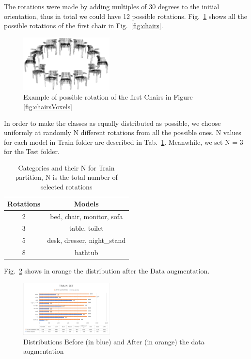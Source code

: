 The rotations were made by adding multiples of 30 degrees to the initial orientation, thus in total we could have 12 possible rotations. Fig.~\ref{fig:rotatedChair} shows all the possible rotations of the first chair in Fig.~\ref{fig:chairs}.
\begin{figure}[h]
\begin{center}
        \centering
        \includegraphics[width=0.42\textwidth]{resources/rotated_voxels_2.png}
        \caption{Example of possible rotation of the first Chairs in Figure \ref{fig:chairsVoxels}}
        \label{fig:rotatedChair}
    \end{center}
\end{figure}
In order to make the classes as equally distributed as possible, we choose uniformly at randomly N different rotations from all the possible ones. N values for each model in Train folder are described in Tab.~\ref{tab:modelRotations}. Meanwhile, we set N = 3 for the Test folder.

\begin{table}[h]
	\centering
	\caption{Categories and their N for Train partition, N is the total number of selected rotations}
	\label{tab:modelRotations}
	\begin{tabular}{|c||c|}
		\hline
		Rotations & Models \\
		\hline
		\hline
            2 & bed, chair, monitor, sofa\\\hline
            3 & table, toilet\\\hline
            5 & desk, dresser, night_stand\\\hline
            8 & bathtub\\\hline
	\end{tabular}
\end{table}

Fig.~\ref{fig:finalTrainSetDistribution} shows in orange the distribution after the Data augmentation.


\begin{figure}[h]
\begin{center}
        \centering
        \includegraphics[width=0.42\textwidth]{resources/finalTrainDistribution.png}
        \caption{Distributions Before (in blue) and After (in orange) the data augmentation}
        \label{fig:finalTrainSetDistribution}
    \end{center}
\end{figure}

